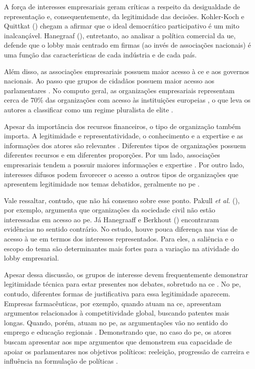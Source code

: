    A força de interesses empresariais geram críticas a respeito da desigualdade de representação e, consequentemente, da legitimidade das decisões. Kohler-Koch e Quittkat (\citeyear{kohler2007desmyth}) chegam a afirmar que o ideal democrático participativo é um mito inalcançável. Hanegraaf (\citeyear{Hanegraaff2024firms}), entretanto, ao analisar a política comercial da \acrshort{ue}, defende que o lobby mais centrado em firmas (ao invés de associações nacionais) é uma função das características de cada indústria e de cada país.

    Além disso, as associações empresariais possuem maior acesso à \acrshort{ce} \cite{gornitzka2015} e aos governos nacionais. Ao passo que grupos de cidadãos possuem maior acesso aos parlamentares \cite{dur20212wholobbies}. No computo geral, as organizações empresariais representam cerca de 70\% das organizações com acesso às instituições europeias \cite{Coen2007}, o que leva os autores a classificar como um regime pluralista de elite \cite{coen1997evolution, coen1998european, Bouwen2002, schmidt2006procedural}. 

    Apesar da importância dos recursos financeiros, o tipo de organização também importa. A legitimidade e representatividade, o conhecimento e a expertise e as informações dos atores são relevantes \cite{Coen2019, dur_measuring_2008}. Diferentes tipos de organizações possuem diferentes recursos e em diferentes proporções. Por um lado, associações empresariais tendem a possuir maiores informações e expertise \cite{dur20212wholobbies}. Por outro lado, interesses difusos podem favorecer o acesso a outros tipos de organizações que apresentem legitimidade nos temas debatidos, geralmente no \acrshort{pe} \cite{kluver2015legislative}. 

    Vale ressaltar, contudo, que não há consenso sobre esse ponto. Pakull \textit{et al.} (\citeyear{Pakull2020}), por exemplo, argumenta que organizações da sociedade civil não estão interessadas em acesso ao \acrshort{pe}. Já Hanegraaff e Berkhout (\citeyear{Hanegraaff2019}) encontraram evidências no sentido contrário. No estudo, houve pouca diferença nas vias de acesso à \acrshort{ue} em termos dos interesses representados. Para eles, a saliência e o escopo do tema são determinantes mais fortes para a variação na atividade do lobby empresarial.

    Apesar dessa discussão, os grupos de interesse devem frequentemente demonstrar legitimidade técnica para estar presentes nos debates, sobretudo na \acrshort{ce} \cite{Bouwen2002}. No \acrshort{pe}, contudo, diferentes formas de justificativa para essa legitimidade aparecem. Empresas farmacêuticas, por exemplo, quando atuam na \acrshort{ce}, apresentam argumentos relacionados à competitividade global, buscando patentes mais longas. Quando, porém, atuam no \acrshort{pe}, as argumentações vão no sentido do emprego e educação regionais \cite{earnshaw2002no, coen2000corporate}. Demonstrando que, no caso do \acrshort{pe}, os atores buscam apresentar aos \acrshort{mpe} argumentos que demonstrem sua capacidade de apoiar os parlamentares nos objetivos políticos: reeleição, progressão de carreira e influência na formulação de políticas \cite{Ibenskas2021}.
    
